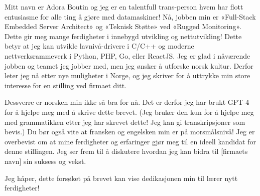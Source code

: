 \documentclass[a4paper,12pt]{article}
\begin{document}

\begin{coverletter}
    Mitt navn er Adora Boutin og jeg er en talentfull trans-person hvem har flott entusiasme for alle ting å gjøre med datamaskiner! Nå, jobben min er «Full-Stack Embedded Server Architect» og «Teknisk Støtte» ved «Rugged Monitoring».
    Dette gir meg mange ferdigheter i innebygd utvikling og nettutvikling! Dette betyr at jeg kan utvikle lavnivå-drivere i C/C++ og moderne nettverksrammeverk i Python, PHP, Go, eller ReactJS.
    Jeg er glad i nåværende jobben og teamet jeg jobber med, men jeg ønsker å utforske norsk kultur.
    Derfor leter jeg nå etter nye muligheter i Norge, og jeg skriver for å uttrykke min store interesse for en stilling ved firmaet ditt.\newline

    Dessverre er norsken min ikke så bra for nå.
    Det er derfor jeg har brukt GPT-4 for å hjelpe meg med å skrive dette brevet.
    (Jeg bruker den kun for å hjelpe meg med grammatikken etter jeg har skrevet dette! Jeg kan gi transkripsjoner som bevis.) Du bør også vite at fransken og engelsken min er på morsmålsnivå! Jeg er overbevist om at mine ferdigheter og erfaringer gjør meg til en ideell kandidat for denne stillingen.
    Jeg ser frem til å diskutere hvordan jeg kan bidra til [firmaets navn] sin suksess og vekst.\newline

    Jeg håper, dette forsøket på brevet kan vise dedikasjonen min til lærer nytt ferdigheter!
\end{coverletter}
\end{document}
